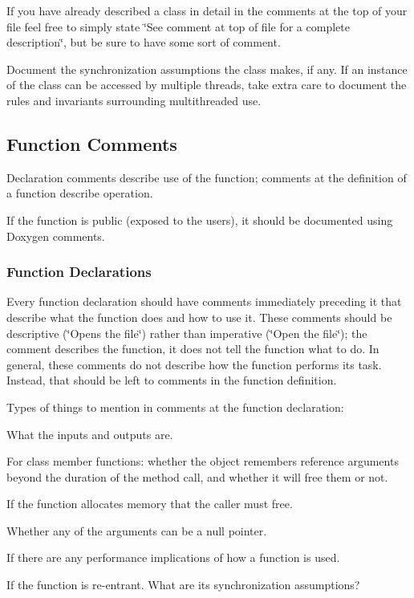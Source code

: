 If you have already described a class in detail in the comments at the top of your file feel free to simply state \char`\"{}\+See comment at top of file for a complete description\char`\"{}, but be sure to have some sort of comment.

Document the synchronization assumptions the class makes, if any. If an instance of the class can be accessed by multiple threads, take extra care to document the rules and invariants surrounding multithreaded use.

\subsection*{Function Comments}

Declaration comments describe use of the function; comments at the definition of a function describe operation.

If the function is public (exposed to the users), it should be documented using Doxygen comments.

\subsubsection*{Function Declarations}

Every function declaration should have comments immediately preceding it that describe what the function does and how to use it. These comments should be descriptive (\char`\"{}\+Opens the file\char`\"{}) rather than imperative (\char`\"{}\+Open the file\char`\"{}); the comment describes the function, it does not tell the function what to do. In general, these comments do not describe how the function performs its task. Instead, that should be left to comments in the function definition.

Types of things to mention in comments at the function declaration\+:


\begin{DoxyItemize}
\item What the inputs and outputs are.
\item For class member functions\+: whether the object remembers reference arguments beyond the duration of the method call, and whether it will free them or not.
\item If the function allocates memory that the caller must free.
\item Whether any of the arguments can be a null pointer.
\item If there are any performance implications of how a function is used.
\item If the function is re-\/entrant. What are its synchronization assumptions?
\end{DoxyItemize}

